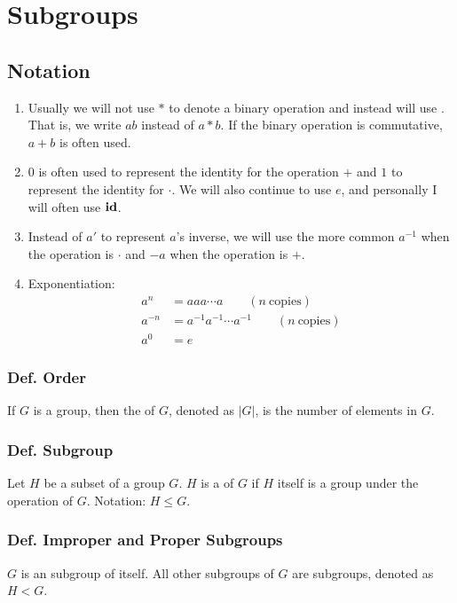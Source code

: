 \section{Subgroups}

\subsection{Notation}

\begin{enumerate}
    \item Usually we will not use $*$ to denote a binary operation and instead will use . That is, we write $ab$ instead of $a*b$. If the binary operation is commutative, $a+b$ is often used.
    \item $0$ is often used to represent the identity for the operation $+$ and $1$ to represent the identity for $\cdot$. We will also continue to use $e$, and personally I will often use $\operatorname{\textbf{id}}$.
    \item Instead of $a'$ to represent $a$'s inverse, we will use the more common $a^{-1}$ when the operation is $\cdot$ and $-a$ when the operation is $+$.
    \item Exponentiation:
    \begin{align*}
        a^n & = aaa\cdots a \qquad (n~\text{copies}) \\
        a^{-n} & = a^{-1}a^{-1}\cdots a^{-1} \qquad (n~\text{copies}) \\
        a^0 & = e
    \end{align*}
\end{enumerate}

\subsubsection{Def. Order}
If $G$ is a group, then the  of $G$, denoted as $|G|$, is the number of elements in $G$.

\subsubsection{Def. Subgroup}
Let $H$ be a subset of a group $G$. $H$ is a  of $G$ if $H$ itself is a group under the operation of $G$. Notation: $H \leq G$.

\subsubsection{Def. Improper and Proper Subgroups}
$G$ is an  subgroup of itself. All other subgroups of $G$ are  subgroups, denoted as $H < G$.

